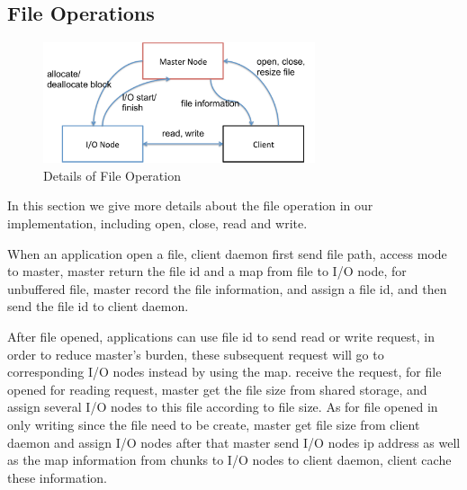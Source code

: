 
\subsection{File Operations}

\begin{figure}
\centering
\includegraphics[width=8cm]{img/file_operation}
\caption{Details of File Operation}
\label{implementation:file operation}
\end{figure}

In this section we give more details about the file operation in our implementation, including
open, close, read and write.

When an application open a file, client daemon first send file path, access mode to master,
master return the file id and a map from file to I/O node,
for unbuffered file, master record the file information, and assign a file id, and then send the
file id to client daemon.

After file opened, applications can use file id to send read or write request, in order to reduce
master's burden, these subsequent request will go to corresponding I/O nodes instead by using the
map.
receive the request, for file opened for reading request, master get the file size from shared
storage, and assign several I/O nodes to this file according to file size.
As for file opened in only writing since the file need to be create, master get file size from
client daemon and assign I/O nodes after that master send I/O nodes ip address as well as the map
information from chunks to I/O nodes to client daemon, client cache these information.

